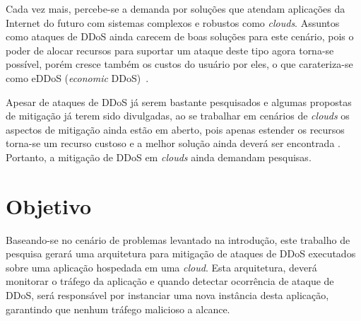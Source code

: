 \documentclass[a4paper, 11pt]{article}
\begin{document}




Cada vez mais, percebe-se a demanda por solu\c{c}\~oes que atendam
aplica\c{c}\~oes da Internet do futuro com sistemas complexos e robustos como
\emph{clouds}. Assuntos como ataques de DDoS ainda carecem de boas
solu\c{c}\~oes para este cen\'ario, pois o poder de
alocar recursos para suportar um ataque deste tipo agora torna-se
poss\'ivel, por\'em cresce tamb\'em os custos do usu\'ario por eles, o que
carateriza-se como eDDoS (\emph{economic} DDoS)~\cite{Soon:10}.
  
Apesar de ataques de DDoS j\'a serem bastante pesquisados e algumas propostas
de mitiga\c{c}\~ao j\'a terem sido divulgadas, ao se trabalhar em cen\'arios de
\emph{clouds} os aspectos de mitiga\c{c}\~ao ainda est\~ao em aberto, pois
apenas estender os recursos torna-se um recurso custoso e a melhor
solu\c{c}\~ao ainda dever\'a ser encontrada . Portanto, a mitiga\c{c}\~ao de
DDoS em \emph{clouds} ainda demandam pesquisas.



\section{Objetivo}
Baseando-se no cen\'ario de problemas levantado na introdu\c{c}\~{a}o, este
trabalho de pesquisa gerar\'a uma arquitetura para mitigação de ataques de
DDoS executados sobre uma aplicação hospedada em uma \emph{cloud}. Esta
arquitetura, dever\'a monitorar o tr\'afego da aplica\c{c}\~{a}o e quando
detectar
ocorrência de ataque de DDoS, ser\'a respons\'avel por instanciar uma nova
instância desta
aplica\c{c}\~{a}o, garantindo que nenhum tr\'afego malicioso a alcance.
\end{document}

